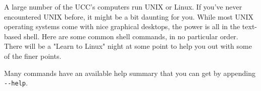 \label{UnixCommands}



\begin{mdframed}

A large number of the UCC's computers run UNIX or Linux. If you've never encountered UNIX before, it might be a bit daunting for you. While most UNIX operating systems come with nice graphical desktops, the power is all in the text-based shell. Here are some common shell commands, in no particular order. There will be a "Learn to Linux" night at some point to help you out with some of the finer points.

Many commands have an available help summary that you can get by appending \verb/--help/.

\end{mdframed}

\newcommand{\uc}[2]{ \shell{#1} & \small{#2} \\}

